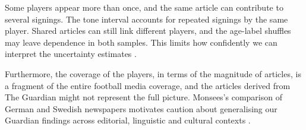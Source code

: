 Some players appear more than once, and the same article can contribute to several signings. The tone interval accounts for repeated signings by the same player. Shared articles can still link different players, and the age-label shuffles may leave dependence in both samples. This limits how confidently we can interpret the uncertainty estimates \cite{hemerik2018exact,winkler2015multilevel}. 

Furthermore, the coverage of the players, in terms of the magnitude of articles, is a fragment of the entire football media coverage, and the articles derived from The Guardian might not represent the full picture. Monsees’s comparison of German and Swedish newspapers motivates caution about generalising our Guardian findings across editorial, linguistic and cultural contexts \cite{monsees2024talent}.
